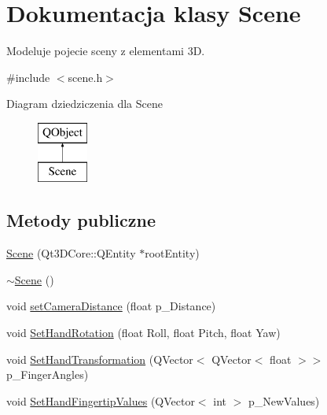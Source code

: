 \hypertarget{class_scene}{}\section{Dokumentacja klasy Scene}
\label{class_scene}


Modeluje pojecie sceny z elementami 3D.  




{\ttfamily \#include $<$scene.\+h$>$}

Diagram dziedziczenia dla Scene\begin{figure}[H]
\begin{center}
\leavevmode
\includegraphics[height=2.000000cm]{class_scene}
\end{center}
\end{figure}
\subsection*{Metody publiczne}
\begin{DoxyCompactItemize}
\item 
\hyperlink{class_scene_ae7977c11ac28fa465cedd4889e7cfd58}{Scene} (Qt3\+D\+Core\+::\+Q\+Entity $\ast$root\+Entity)
\item 
\hyperlink{class_scene_a3b8cec2e32546713915f8c6303c951f1}{$\sim$\+Scene} ()
\item 
void \hyperlink{class_scene_a53a7f1676ecb6d9b7312e275b3c8256e}{set\+Camera\+Distance} (float p\+\_\+\+Distance)
\item 
void \hyperlink{class_scene_a85cdeb1563e84f148579f834808aa527}{Set\+Hand\+Rotation} (float Roll, float Pitch, float Yaw)
\item 
void \hyperlink{class_scene_ae58cf344ad78420d37acde7984c9a4e8}{Set\+Hand\+Transformation} (Q\+Vector$<$ Q\+Vector$<$ float $>$$>$ p\+\_\+\+Finger\+Angles)
\item 
void \hyperlink{class_scene_a4dcd24690f433927c6ca75e9980afd53}{Set\+Hand\+Fingertip\+Values} (Q\+Vector$<$ int $>$ p\+\_\+\+New\+Values)
\end{DoxyCompactItemize}
